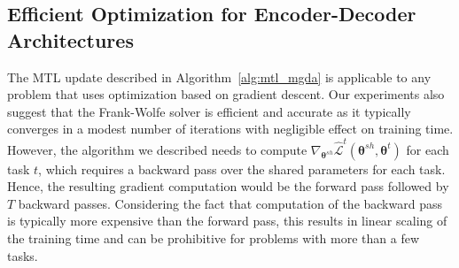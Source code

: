 \documentclass{article}
\def\lL{\mathcal{L}}
\def\btheta{{\bm\theta}}
\begin{document}
\subsection{Efficient Optimization for Encoder-Decoder Architectures}
\label{sec:approximation}

The MTL update described in Algorithm~\ref{alg:mtl_mgda} is applicable to any problem that uses optimization based on gradient descent. Our experiments also suggest that the Frank-Wolfe solver is efficient and accurate as it typically converges in a modest number of iterations with negligible effect on training time. However, the algorithm we described needs to compute $\nabla_{\btheta^{sh}} \hat{\lL}^t(\btheta^{sh},\btheta^t)$ for each task $t$, which requires a backward pass over the shared parameters for each task. Hence, the resulting gradient computation would be the forward pass followed by $T$ backward passes. Considering the fact that computation of the backward pass is typically more expensive than the forward pass, this results in linear scaling of the training time and can be prohibitive for problems with more than a few tasks.
\end{document}
